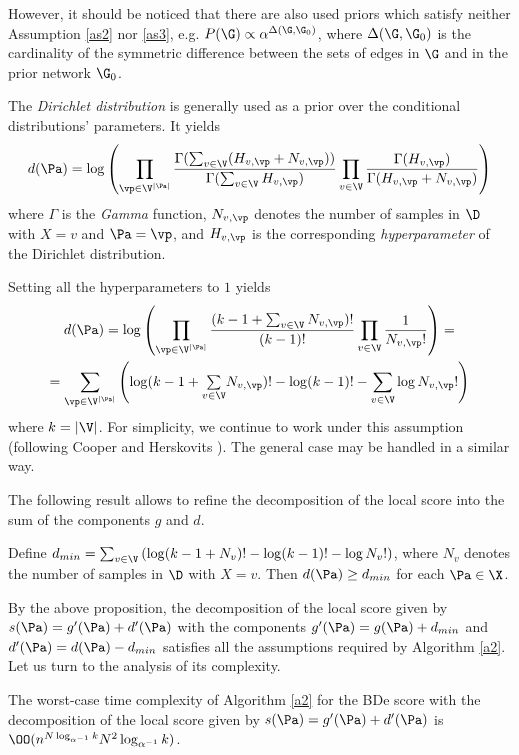  However, it should be noticed that there are also used priors 
 which satisfy neither Assumption \ref{as2} nor \ref{as3}, 
 e.g.  $P(\G)\propto\alpha^{\Delta(\G,\G_0)}$, 
 where $\Delta(\G,\G_0)$ is the cardinality of the symmetric difference 
 between the sets of edges in $\G$ and in the prior network $\G_0$.
 
 The \emph{Dirichlet distribution} is generally used as a prior over the conditional distributions' parameters.
 It yields
 $$d(\Pa)=\log\left(\prod_{\vp\in\V^{|\Pa|}}
  \frac{\Gamma(\sum_{v\in\V}(H_{v,\vp}+N_{v,\vp}))}{\Gamma(\sum_{v\in\V}H_{v,\vp})}
  \prod_{v\in\V}\frac{\Gamma(H_{v,\vp})}{\Gamma(H_{v,\vp}+N_{v,\vp})}\right)$$
 where $\Gamma$ is the \emph{Gamma} function, $N_{v,\vp}$ denotes the number of samples in $\D$ with $X=v$ and $\Pa=\vp$, and $H_{v,\vp}$ is the corresponding \emph{hyperparameter} of the Dirichlet distribution.
 
 Setting all the hyperparameters to $1$ yields
 \begin{multline*}d(\Pa)=\log\left(\prod_{\vp\in\V^{|\Pa|}}
  \frac{(k-1+\sum_{v\in\V}N_{v,\vp})!}{(k-1)!}
  \prod_{v\in\V}\frac{1}{N_{v,\vp}!}\right)=\\
  =\sum_{\vp\in\V^{|\Pa|}}\left(
 \log({\textstyle k-1+\underset{v\in\V}{\sum}N_{v,\vp}})!-\log(k-1)!
  -\sum_{v\in\V}\log{N_{v,\vp}!}\right)
 \end{multline*}
 where $k=|\V|$.
 For simplicity, we continue to work under this assumption (following Cooper and Herskovits \cite{cooper92}).
 The general case may be handled in a similar way.
 
 The following result allows to refine the decomposition of the local score into the sum of the components $g$ and $d$.
 
 \begin{proposition}
 Define $d_{min}=\sum_{v\in\V}\left(\log(k-1+N_v)!-\log(k-1)!-\log N_v!\right)$, where $N_v$ denotes the number of samples in $\D$ with $X=v$. 
 Then $d(\Pa)\ge d_{min}$ for each $\Pa\in\X$.
 \end{proposition}
 
 By the above proposition, the decomposition of the local score given by $s(\Pa)=g'(\Pa)+d'(\Pa)$ with the components $g'(\Pa)=g(\Pa)+d_{min}$ and $d'(\Pa)=d(\Pa)-d_{min}$ satisfies all the assumptions required by Algorithm \ref{a2}. 
 Let us turn to the analysis of its complexity.
  
 \begin{theorem}
 The worst-case time complexity of Algorithm \ref{a2} for the BDe score with the decomposition of the local score given by $s(\Pa)=g'(\Pa)+d'(\Pa)$ is $\OO(n^{N\log_{\alpha^{-1}}k}N^2\log_{\alpha^{-1}}k)$.
 \end{theorem}


